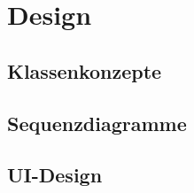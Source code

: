 \chapter{Design}
\label{pd-design}






\section{Klassenkonzepte}


\section{Sequenzdiagramme}


\section{UI-Design}
